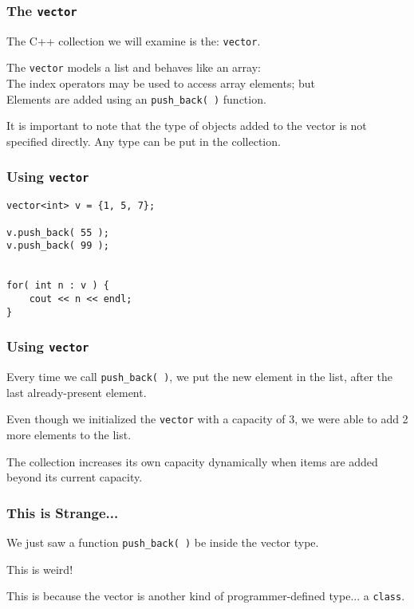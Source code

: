 \begin{frame}
\frametitle{The \texttt{vector}}

The C++ collection we will examine is the: \texttt{vector}.

The \texttt{vector}  models a list and behaves like an array:\\
\quad The index operators may be used to access array elements; but \\
\quad Elements are added using an \texttt{push\_back( )} function.

It is important to note that the type of objects added to the vector is not specified directly. Any type can be put in the collection.
\end{frame}

\begin{frame}[fragile]
\frametitle{Using \texttt{vector}}
\begin{verbatim}
vector<int> v = {1, 5, 7};
		
v.push_back( 55 );
v.push_back( 99 );


for( int n : v ) {
    cout << n << endl;
}
\end{verbatim}
\end{frame}


\begin{frame}
\frametitle{Using \texttt{vector}}

Every time we call \texttt{push\_back( )}, we put the new element in the list, after the last already-present element.

Even though we initialized the \texttt{vector} with a capacity of 3, we were able to add 2 more elements to the list.

The collection increases its own capacity dynamically when items are added beyond its current capacity.

\end{frame}



\begin{frame}
\frametitle{This is Strange...}

We just saw a function \texttt{push\_back( )} be inside the vector type.

This is weird!

This is because the vector is another kind of programmer-defined type... a \texttt{class}.


\end{frame}



